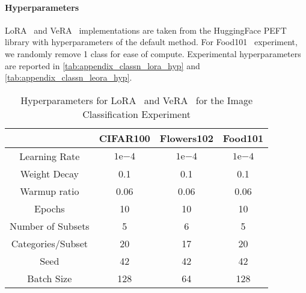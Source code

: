 \paragraph{Hyperparameters} LoRA~\citep{hu2021lora} and VeRA~\citep{kopiczko_vera_2023} implementations are taken from the HuggingFace PEFT~\citep{peft} library with hyperparameters of the default method. For Food101~\citep{food101} experiment, we randomly remove 1 class for ease of compute. Experimental hyperparameters are reported in \autoref{tab:appendix_classn_lora_hyp} and \autoref{tab:appendix_classn_leora_hyp}.
\begin{table}[h]
  \centering
   \caption{Hyperparameters for LoRA~\citep{hu2021lora} and VeRA~\citep{kopiczko_vera_2023} for the Image Classification Experiment}
  \begin{tabular}{cccc}
    \toprule
    & \textbf{CIFAR100} & \textbf{Flowers102} & \textbf{Food101} \\
    \midrule
    Learning Rate            & $1\mathrm{e}{-4}$
 & $1\mathrm{e}{-4}$ & $1\mathrm{e}{-4}$  \\ 
    Weight Decay            & 0.1      & 0.1      & 0.1          \\ 
    Warmup ratio  & 0.06     & 0.06     & 0.06      \\ 
    Epochs        & 10       & 10       & 10             \\ 
    Number of Subsets          & 5       & 6        & 5        \\ 
    Categories/Subset          & 20      & 17        & 20     \\
    Seed          & 42        & 42        & 42            \\ 
    Batch Size          & 128       & 64        & 128      \\ 
    \bottomrule
  \end{tabular}
  \label{tab:appendix_classn_lora_hyp}
\end{table}


